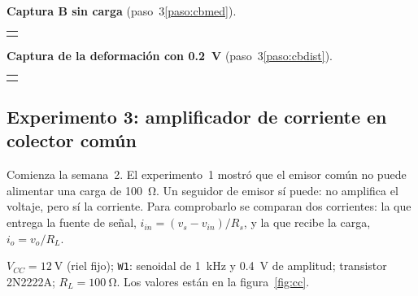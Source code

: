 \documentclass[11pt,a4paper]{article}
\newcommand{\cuadrorespuesta}{%
  \par\vspace{6pt}\noindent
  \begin{tabularx}{\linewidth}{|>{\centering\arraybackslash}X|}
    \hline
    \rule{0pt}{4.4cm}\raisebox{2.1cm}{\textcolor{black!45}{Figura}}\\
    \hline
    \rule{0pt}{2.0cm}\raisebox{0.9cm}{\textcolor{black!45}{Comentario}}\\
    \hline
  \end{tabularx}\par\vspace{8pt}%
}
\begin{document}
\noindent\begin{minipage}{\linewidth}
\noindent\textbf{Captura B sin carga} (paso~3\ref{paso:cbmed}).
\cuadrorespuesta
\end{minipage}\par

\noindent\begin{minipage}{\linewidth}
\noindent\textbf{Captura de la deformación con \qty{0.2}{\volt}} (paso~3\ref{paso:cbdist}).
\cuadrorespuesta
\end{minipage}\par

\subsection{Experimento 3: amplificador de corriente en colector común}
Comienza la semana~2. El experimento~1 mostró que el emisor común no puede alimentar una carga
de \qty{100}{\ohm}. Un seguidor de emisor sí puede: no amplifica el voltaje, pero sí la
corriente. Para comprobarlo se comparan dos corrientes: la que entrega la fuente de señal,
$i_{in} = (v_s - v_{in})/R_s$, y la que recibe la carga, $i_o = v_o/R_L$.

$V_{CC} = \qty{12}{\volt}$ (riel fijo); \texttt{W1}: senoidal de \qty{1}{\kilo\hertz} y
\qty{0.4}{\volt} de amplitud; transistor 2N2222A; $R_L = \qty{100}{\ohm}$. Los valores están
en la figura~\ref{fig:cc}.
\end{document}
